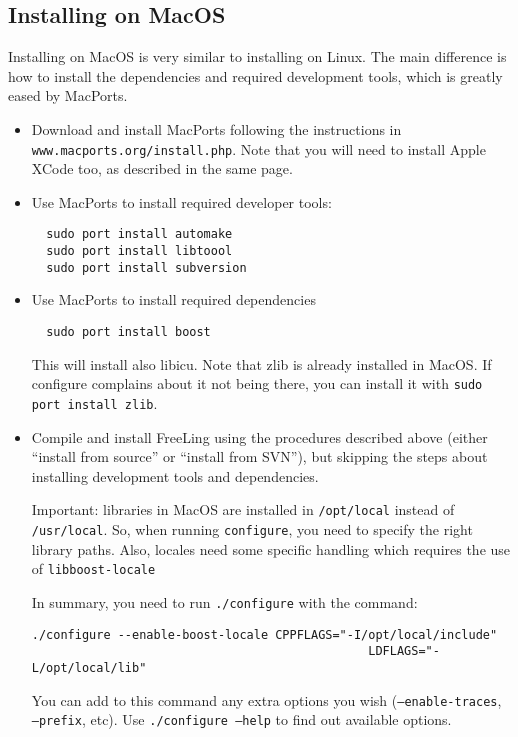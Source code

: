 \documentclass[a4paper]{book}
\begin{document}
\subsection{Installing on MacOS}

  Installing on MacOS is very similar to installing on Linux. The main
  difference is how to install the dependencies and required
  development tools, which is greatly eased by MacPorts.

\begin{itemize}
 \item Download and install MacPorts following the instructions in
   \texttt{www.macports.org/install.php}.  Note that you will need to
   install Apple XCode too, as described in the same page.
 \item Use MacPorts to install required developer tools:
 \begin{verbatim}
  sudo port install automake
  sudo port install libtoool
  sudo port install subversion
 \end{verbatim}
 \item Use MacPorts to install required dependencies
 \begin{verbatim}
  sudo port install boost
 \end{verbatim}
  This will install also libicu. Note that zlib is already installed
  in MacOS.  If configure complains about it not being there, you can
  install it with \texttt{sudo port install zlib}.

 \item Compile and install FreeLing using the procedures described
   above (either ``install from source'' or ``install from SVN''), but
   skipping the steps about installing development tools and
   dependencies.
  
  Important: libraries in MacOS are installed in \texttt{/opt/local}
  instead of \texttt{/usr/local}. So, when running \texttt{configure},
  you need to specify the right library paths.  Also, locales need
  some specific handling which requires the use of
  \texttt{libboost-locale}

   In summary, you need to run \texttt{./configure} with the command:
 \begin{verbatim}
./configure --enable-boost-locale CPPFLAGS="-I/opt/local/include" 
                                               LDFLAGS="-L/opt/local/lib"
 \end{verbatim}
   You can add to this command any extra options you wish
   (\texttt{--enable-traces}, \texttt{--prefix}, etc).  Use
   \texttt{./configure --help} to find out available options.

\end{itemize}
\end{document}
